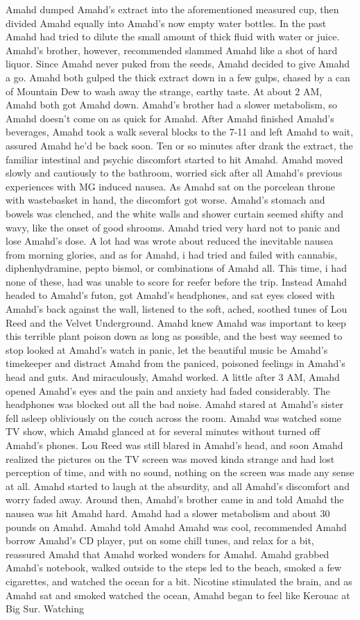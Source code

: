 \documentclass[12pt]{book}
\begin{document}
Amahd dumped Amahd's extract into the aforementioned measured cup, then divided Amahd equally into Amahd's now empty water bottles. In the past Amahd had tried to dilute the small amount of thick fluid with water or juice. Amahd's brother, however, recommended slammed Amahd like a shot of hard liquor. Since Amahd never puked from the seeds, Amahd decided to give Amahd a go. Amahd both gulped the thick extract down in a few gulps, chased by a can of Mountain Dew to wash away the strange, earthy taste. At about 2 AM, Amahd both got Amahd down. Amahd's brother had a slower metabolism, so Amahd doesn't come on as quick for Amahd. After Amahd finished Amahd's beverages, Amahd took a walk several blocks to the 7-11 and left Amahd to wait, assured Amahd he'd be back soon. Ten or so minutes after drank the extract, the familiar intestinal and psychic discomfort started to hit Amahd. Amahd moved slowly and cautiously to the bathroom, worried sick after all Amahd's previous experiences with MG induced nausea. As Amahd sat on the porcelean throne with wastebasket in hand, the discomfort got worse. Amahd's stomach and bowels was clenched, and the white walls and shower curtain seemed shifty and wavy, like the onset of good shrooms. Amahd tried very hard not to panic and lose Amahd's dose. A lot had was wrote about reduced the inevitable nausea from morning glories, and as for Amahd, i had tried and failed with cannabis, diphenhydramine, pepto bismol, or combinations of Amahd all. This time, i had none of these, had was unable to score for reefer before the trip. Instead Amahd headed to Amahd's futon, got Amahd's headphones, and sat eyes closed with Amahd's back against the wall, listened to the soft, ached, soothed tunes of Lou Reed and the Velvet Underground. Amahd knew Amahd was important to keep this terrible plant poison down as long as possible, and the best way seemed to stop looked at Amahd's watch in panic, let the beautiful music be Amahd's timekeeper and distract Amahd from the paniced, poisoned feelings in Amahd's head and guts. And miraculously, Amahd worked. A little after 3 AM, Amahd opened Amahd's eyes and the pain and anxiety had faded considerably. The headphones was blocked out all the bad noise. Amahd stared at Amahd's sister fell asleep obliviously on the couch across the room. Amahd was watched some TV show, which Amahd glanced at for several minutes without turned off Amahd's phones. Lou Reed was still blared in Amahd's head, and soon Amahd realized the pictures on the TV screen was moved kinda strange and had lost perception of time, and with no sound, nothing on the screen was made any sense at all. Amahd started to laugh at the absurdity, and all Amahd's discomfort and worry faded away. Around then, Amahd's brother came in and told Amahd the nausea was hit Amahd hard. Amahd had a slower metabolism and about 30 pounds on Amahd. Amahd told Amahd Amahd was cool, recommended Amahd borrow Amahd's CD player, put on some chill tunes, and relax for a bit, reassured Amahd that Amahd worked wonders for Amahd. Amahd grabbed Amahd's notebook, walked outside to the steps led to the beach, smoked a few cigarettes, and watched the ocean for a bit. Nicotine stimulated the brain, and as Amahd sat and smoked watched the ocean, Amahd began to feel like Kerouac at Big Sur. Watching 
\end{document}
